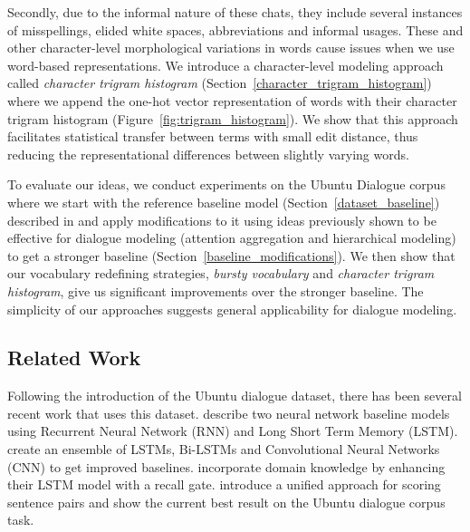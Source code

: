 \documentclass[11pt]{report}
\renewcommand\cite{\citep}	%
\begin{document}
Secondly, due to the informal nature of these chats, they include several instances of misspellings, elided white spaces, abbreviations and informal usages. These and other character-level morphological variations in words cause issues when we use word-based representations. We introduce a character-level modeling approach called \textit{character trigram histogram} (Section~\ref{character_trigram_histogram}) where we append the one-hot vector representation of words with their character trigram histogram (Figure~\ref{fig:trigram_histogram}). We show that this approach facilitates statistical transfer between terms with small edit distance, thus reducing the representational differences between slightly varying words.

To evaluate our ideas, we conduct experiments on the Ubuntu Dialogue corpus where we start with the reference baseline model (Section~\ref{dataset_baseline}) described in \cite{lowe2015ubuntu} and apply modifications to it using ideas previously shown to be effective for dialogue modeling (attention aggregation and hierarchical modeling) to get a stronger baseline (Section~\ref{baseline_modifications}). We then show that our vocabulary redefining strategies, \textit{bursty vocabulary} and \textit{character trigram histogram}, give us significant improvements over the stronger baseline.  The simplicity of our approaches suggests general applicability for dialogue modeling. %

\subsection{Related Work} \label{related_work}

Following the introduction of the Ubuntu dialogue dataset, there has been several recent work that uses this dataset. 
\cite{lowe2015ubuntu} describe two neural network baseline models using Recurrent Neural Network (RNN) and Long Short Term Memory (LSTM). %
\cite{kadlec2015improved} create an ensemble of LSTMs, Bi-LSTMs and Convolutional Neural Networks (CNN) to get improved baselines. 
\cite{xu2016incorporating} incorporate domain knowledge by enhancing their LSTM model with a recall gate.
\cite{baudivs2016sentence} introduce a unified approach for scoring sentence pairs %
and show the current best result on the Ubuntu dialogue corpus task. 
\end{document}
